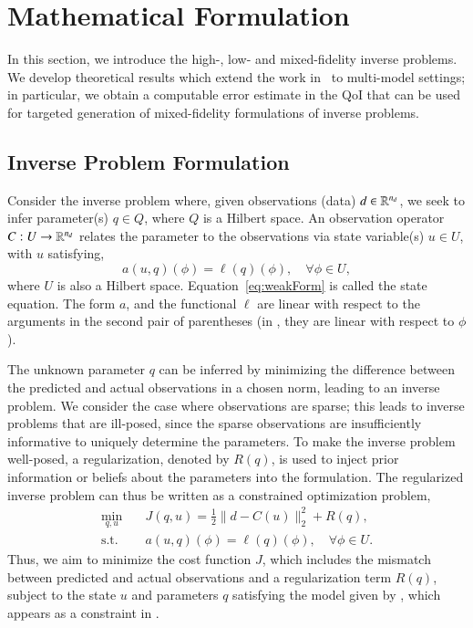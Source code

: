 \section{Mathematical Formulation}\label{sec:form}
%
In this section, we introduce the high-, low- and mixed-fidelity inverse problems. We develop theoretical results which extend the work in~\cite{BecVex05} to multi-model settings; in particular, we obtain a computable error estimate in the QoI that can be used for targeted generation of mixed-fidelity formulations of inverse problems.

\subsection{Inverse Problem Formulation}  \label{sec:setup}
%
Consider the inverse problem where, given observations (data) $d\in{\mathbb{R}}^{n_d}$, we seek to infer parameter(s) $q\in Q$, where $Q$ is a Hilbert space. An observation operator $C:U\to{\mathbb{R}}^{n_d}$ relates the parameter to the observations via state variable(s) $u\in U$, with $u$ satisfying,
%
\begin{equation}
a(u,q)(\phi)=\ell(q)(\phi),\quad\forall\phi\in U,
\label{eq:weakForm}
\end{equation}
%
where $U$ is also a Hilbert space. Equation~\ref{eq:weakForm} is called the state equation. The form $a$, and the functional $\ell$ are linear with respect to the arguments in the second pair of parentheses (in , they are linear with respect to $\phi$).

The unknown parameter $q$ can be inferred by minimizing the difference between the predicted and actual observations in a chosen norm, leading to an inverse problem. We consider the case where observations are sparse; this leads to inverse problems that are ill-posed, since the sparse observations are insufficiently informative to uniquely determine the parameters. To make the inverse problem well-posed, a regularization, denoted by $R(q)$, is used to inject prior information or beliefs about the parameters into the formulation. The regularized inverse problem can thus be written as a constrained optimization problem,
%
\begin{subequations}
\label{eq:invOpt}
\begin{align}
\min\limits_{q,u} & \quad J(q,u)=\frac{1}{2}\|d-C(u)\|_2^2 + R(q), \label{eq:invOpt_obj} \\
\textrm{s.t. }& \quad a(u,q)(\phi)=\ell(q)(\phi),\quad\forall\phi\in U. \label{eq:invOpt_cons}
\end{align}
\end{subequations}
%
Thus, we aim to minimize the cost function $J$, which includes the mismatch between predicted and actual observations and a regularization term $R(q)$, subject to the state $u$ and parameters $q$ satisfying the model given by , which appears as a constraint in .

